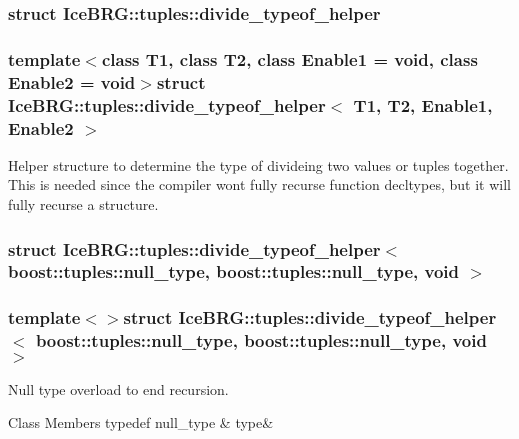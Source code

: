 \subsubsection{struct Ice\+B\+R\+G\+:\+:tuples\+:\+:divide\+\_\+typeof\+\_\+helper}
\subsubsection*{template$<$class T1, class T2, class Enable1 = void, class Enable2 = void$>$struct Ice\+B\+R\+G\+::tuples\+::divide\+\_\+typeof\+\_\+helper$<$ T1, T2, Enable1, Enable2 $>$}

Helper structure to determine the type of divideing two values or tuples together. This is needed since the compiler won\textquotesingle{}t fully recurse function decltypes, but it will fully recurse a structure. \label{structIceBRG_1_1tuples_1_1divide__typeof__helper_3_01boost_1_1tuples_1_1null__type_00_01boost_1_bd03af67120e73dd34936ad50f2c1b33}
\hypertarget{namespaceIceBRG_1_1tuples_structIceBRG_1_1tuples_1_1divide__typeof__helper_3_01boost_1_1tuples_1_1null__type_00_01boost_1_bd03af67120e73dd34936ad50f2c1b33}{}
\subsubsection{struct Ice\+B\+R\+G\+:\+:tuples\+:\+:divide\+\_\+typeof\+\_\+helper$<$ boost\+:\+:tuples\+:\+:null\+\_\+type, boost\+:\+:tuples\+:\+:null\+\_\+type, void $>$}
\subsubsection*{template$<$$>$struct Ice\+B\+R\+G\+::tuples\+::divide\+\_\+typeof\+\_\+helper$<$ boost\+::tuples\+::null\+\_\+type, boost\+::tuples\+::null\+\_\+type, void $>$}

Null type overload to end recursion. \begin{DoxyFields}{Class Members}
\hypertarget{namespaceIceBRG_1_1tuples_a3b0c6a33f7c35a75c21f00d781ada664}{}typedef null\+\_\+type\label{namespaceIceBRG_1_1tuples_a3b0c6a33f7c35a75c21f00d781ada664}
&
type&
\\
\hline

\end{DoxyFields}
\label{structIceBRG_1_1tuples_1_1divide__typeof__helper_3_01boost_1_1tuples_1_1null__type_00_01T_00_01void_01_4}
\hypertarget{namespaceIceBRG_1_1tuples_structIceBRG_1_1tuples_1_1divide__typeof__helper_3_01boost_1_1tuples_1_1null__type_00_01T_00_01void_01_4}{}
